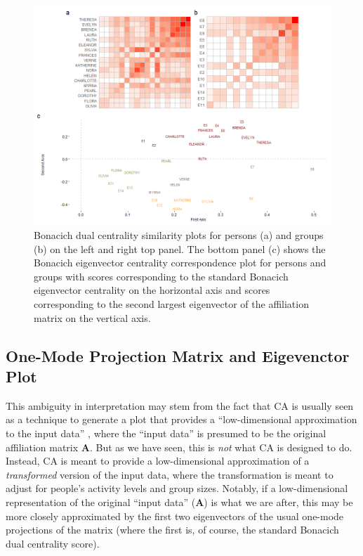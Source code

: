 \documentclass[a4paper,fleqn]{cas-sc}
\begin{document}
\begin{figure}
    \centering
    \includegraphics[width=1.0\textwidth]{Plots/bon-sim.png}
    \caption{Bonacich dual centrality similarity plots for persons (a) and groups (b) on the left and right top panel. The bottom panel (c) shows the Bonacich eigenvector centrality correspondence plot for persons and groups with scores corresponding to the standard Bonacich eigenvector centrality on the horizontal axis and scores corresponding to the second largest eigenvector of the affiliation matrix on the vertical axis.}
    \label{fig:bon-sim}
\end{figure}

\subsection{One-Mode Projection Matrix and Eigevenctor Plot}
This ambiguity in interpretation may stem from the fact that CA is usually seen as a technique to generate a plot that provides a ``low-dimensional approximation to the input data'' \citep[125]{faust2005using}, where the ``input data'' is presumed to be the original affiliation matrix $\mathbf{A}$. But as we have seen, this is \textit{not} what CA is designed to do. Instead, CA is meant to provide a low-dimensional approximation of a \textit{transformed} version of the input data, where the transformation is meant to adjust for people's activity levels and group sizes. Notably, if a low-dimensional representation of the original ``input data'' ($\mathbf{A}$) is what we are after, this may be more closely approximated by the first two eigenvectors of the usual one-mode projections of the matrix (where the first is, of course, the standard Bonacich dual centrality score). 
\end{document}
